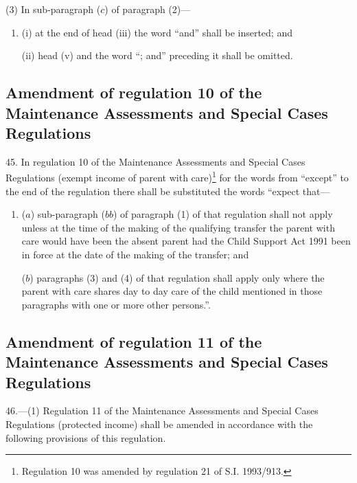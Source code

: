 \documentclass[12pt,a4paper]{article}
\begin{document}
(3) In sub-paragraph ($c$) of paragraph (2)—
\begin{enumerate}\item[]
(i) at the end of head (iii) the word “and” shall be inserted; and

(ii) head (v) and the word “; and” preceding it shall be omitted.
\end{enumerate}

\subsection[45. Amendment of regulation 10 of the Maintenance Assessments and Special Cases Regulations]{Amendment of regulation 10 of the Maintenance Assessments and Special Cases Regulations}

45.  In regulation 10 of the Maintenance Assessments and Special Cases Regulations (exempt income of parent with care)\footnote{\frenchspacing Regulation 10 was amended by regulation 21 of S.I. 1993/913.} for the words from “except” to the end of the regulation there shall be substituted the words “expect that—
\begin{enumerate}\item[]
($a$) sub-paragraph ($bb$) of paragraph (1) of that regulation shall not apply unless at the time of the making of the qualifying transfer the parent with care would have been the absent parent had the Child Support Act 1991 been in force at the date of the making of the transfer; and

($b$) paragraphs (3) and (4) of that regulation shall apply only where the parent with care shares day to day care of the child mentioned in those paragraphs with one or more other persons.”.
\end{enumerate}

\subsection[46. Amendment of regulation 11 of the Maintenance Assessments and Special Cases Regulations]{Amendment of regulation 11 of the Maintenance Assessments and Special Cases Regulations}

46.—(1) Regulation 11 of the Maintenance Assessments and Special Cases Regulations (protected income) shall be amended in accordance with the following provisions of this regulation.
\end{document}
